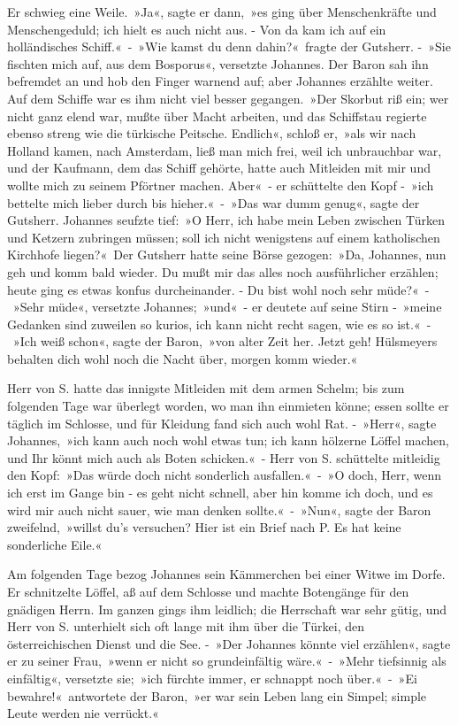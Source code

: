Er schwieg eine Weile. »Ja«, sagte er dann, »es ging über Menschenkräfte und Menschengeduld; ich hielt es auch nicht aus. - Von da kam ich auf ein holländisches Schiff.« - »Wie kamst du denn dahin?« fragte der Gutsherr. - »Sie fischten mich auf, aus dem Bosporus«, versetzte Johannes. Der Baron sah ihn befremdet an und hob den Finger warnend auf; aber Johannes erzählte weiter. Auf dem Schiffe war es ihm nicht viel besser gegangen. »Der Skorbut riß ein; wer nicht ganz elend war, mußte über Macht arbeiten, und das Schiffstau regierte ebenso streng wie die türkische Peitsche. Endlich«, schloß er, »als wir nach Holland kamen, nach Amsterdam, ließ man mich frei, weil ich unbrauchbar war, und der Kaufmann, dem das Schiff gehörte, hatte auch Mitleiden mit mir und wollte mich zu seinem Pförtner machen. Aber« - er schüttelte den Kopf - »ich bettelte mich lieber durch bis hieher.« - »Das war dumm genug«, sagte der Gutsherr. Johannes seufzte tief: »O Herr, ich habe mein Leben zwischen Türken und Ketzern zubringen müssen; soll ich nicht wenigstens auf einem katholischen Kirchhofe liegen?« Der Gutsherr hatte seine Börse gezogen: »Da, Johannes, nun geh und komm bald wieder. Du mußt mir das alles noch ausführlicher erzählen; heute ging es etwas konfus durcheinander. - Du bist wohl noch sehr müde?« - »Sehr müde«, versetzte Johannes; »und« - er deutete auf seine Stirn - »meine Gedanken sind zuweilen so kurios, ich kann nicht recht sagen, wie es so ist.« - »Ich weiß schon«, sagte der Baron, »von alter Zeit her. Jetzt geh! Hülsmeyers behalten dich wohl noch die Nacht über, morgen komm wieder.«

Herr von S. hatte das innigste Mitleiden mit dem armen Schelm; bis zum folgenden Tage war überlegt worden, wo man ihn einmieten könne; essen sollte er täglich im Schlosse, und für Kleidung fand sich auch wohl Rat. - »Herr«, sagte Johannes, »ich kann auch noch wohl etwas tun; ich kann hölzerne Löffel machen, und Ihr könnt mich auch als Boten schicken.« - Herr von S. schüttelte mitleidig den Kopf: »Das würde doch nicht sonderlich ausfallen.« - »O doch, Herr, wenn ich erst im Gange bin - es geht nicht schnell, aber hin komme ich doch, und es wird mir auch nicht sauer, wie man denken sollte.« - »Nun«, sagte der Baron zweifelnd, »willst du’s versuchen? Hier ist ein Brief nach P. Es hat keine sonderliche Eile.«

Am folgenden Tage bezog Johannes sein Kämmerchen bei einer Witwe im Dorfe. Er schnitzelte Löffel, aß auf dem Schlosse und machte Botengänge für den gnädigen Herrn. Im ganzen gings ihm leidlich; die Herrschaft war sehr gütig, und Herr von S. unterhielt sich oft lange mit ihm über die Türkei, den österreichischen Dienst und die See. - »Der Johannes könnte viel erzählen«, sagte er zu seiner Frau, »wenn er nicht so grundeinfältig wäre.« - »Mehr tiefsinnig als einfältig«, versetzte sie; »ich fürchte immer, er schnappt noch über.« - »Ei bewahre!« antwortete der Baron, »er war sein Leben lang ein Simpel; simple Leute werden nie verrückt.«


